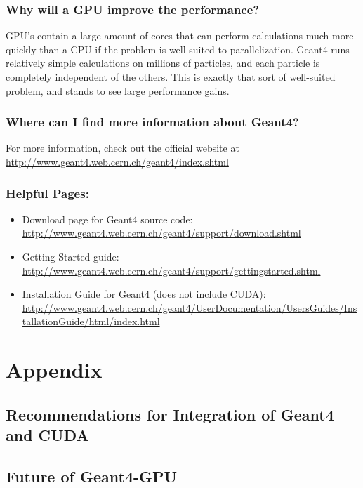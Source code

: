 \documentclass[12pt]{article}
\begin{document}
\subsubsection{Why will a GPU improve the performance?}
GPU's contain a large amount of cores that can perform calculations much more quickly than a CPU if the problem is well-suited to parallelization. Geant4 runs relatively simple calculations on millions of particles, and each particle is completely independent of the others. This is exactly that sort of well-suited problem, and stands to see large performance gains.

\subsubsection{Where can I find more information about Geant4?}
For more information, check out the official website at \url{http://www.geant4.web.cern.ch/geant4/index.shtml}

\subsubsection{Helpful Pages:}
\begin{itemize}
\item Download page for Geant4 source code: \url{http://www.geant4.web.cern.ch/geant4/support/download.shtml}
\item Getting Started guide: \url{http://www.geant4.web.cern.ch/geant4/support/gettingstarted.shtml}
\item Installation Guide for Geant4 (does not include CUDA): \url{http://www.geant4.web.cern.ch/geant4/UserDocumentation/UsersGuides/InstallationGuide/html/index.html}
\end{itemize}

\section{Appendix} %
\subsection{Recommendations for Integration of Geant4 and CUDA}
\subsection{Future of Geant4-GPU}
\end{document}
